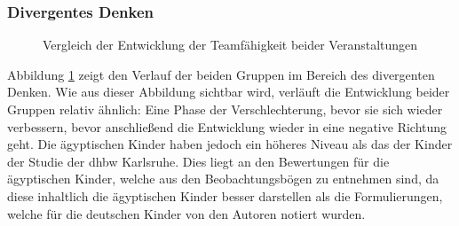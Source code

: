 \subsubsection{Divergentes Denken}
\begin{figure}[H]
	\centering
	\caption[Vergleich Entwicklung Teamfähigkeit beider Veranstaltungen]{Vergleich der Entwicklung der Teamfähigkeit beider Veranstaltungen}
	\label{img:comparingDivergent}
\end{figure}
Abbildung \ref{img:comparingDivergent} zeigt den Verlauf der beiden Gruppen im Bereich des divergenten Denken. Wie aus dieser Abbildung sichtbar wird, verläuft die Entwicklung beider Gruppen relativ ähnlich: Eine Phase der Verschlechterung, bevor sie sich wieder verbessern, bevor anschließend die Entwicklung wieder in eine negative Richtung geht. Die ägyptischen Kinder haben jedoch ein höheres Niveau als das der Kinder der Studie der \acrshort{dhbw} Karlsruhe. Dies liegt an den Bewertungen für die ägyptischen Kinder, welche aus den Beobachtungsbögen zu entnehmen sind, da diese inhaltlich die ägyptischen Kinder besser darstellen als die Formulierungen, welche für die deutschen Kinder von den Autoren notiert wurden.

